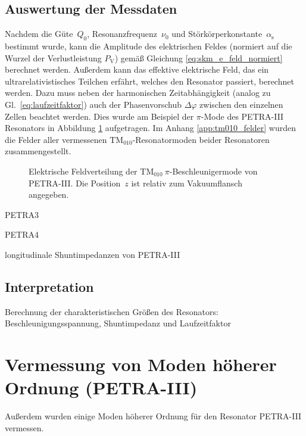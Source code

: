 \subsection{Auswertung der Messdaten}
Nachdem die Güte~$Q_0$, Resonanzfrequenz~$\nu_0$ und Störkörperkonstante~$\alpha_\mathrm{s}$ bestimmt wurde, kann die Amplitude des elektrischen Feldes (normiert auf die Wurzel der Verlustleistung $P_\mathrm{V}$) gemäß Gleichung \eqref{eq:skm_e_feld_normiert} berechnet werden.
Außerdem kann das effektive elektrische Feld, das ein ultrarelativistisches Teilchen erfährt, welches den Resonator passiert, berechnet werden.
Dazu muss neben der harmonischen Zeitabhängigkeit (analog zu Gl.\ \eqref{eq:laufzeitfaktor}) auch der Phasenvorschub $\Delta \varphi$ zwischen den einzelnen Zellen beachtet werden.
Dies wurde am Beispiel der $\pi$-Mode des PETRA-III Resonators in Abbildung \ref{fig:bsp_feld_tm010pi_petra3} aufgetragen.
Im Anhang \ref{app:tm010_felder} wurden die Felder aller vermessenen $\mathrm{TM}_{010}$-Resonatormoden beider Resonatoren zusammengestellt.  
\begin{figure}[h]
	\centering
	
	\caption[Elektrische Feldverteilung der $\mathrm{TM}_{010}~\pi$-Beschleunigermode von PETRA-III]{Elektrische Feldverteilung der $\mathrm{TM}_{010}~\pi$-Beschleunigermode von PETRA-III. Die Position~$z$ ist relativ zum Vakuumflansch angegeben.}
	\label{fig:bsp_feld_tm010pi_petra3}
\end{figure}

\begin{table}
	\begin{subtable}{1\textwidth}
		\centering
		
		\caption{PETRA3}
	\end{subtable}
	\begin{subtable}{1\textwidth}
		\centering
		
		\caption{PETRA4}
	\end{subtable}
	\caption{longitudinale Shuntimpedanzen von PETRA-III }
\end{table}



\subsection{Interpretation}
Berechnung der charakteristischen Größen des Resonators: Beschleunigungsspannung, Shuntimpedanz und Laufzeitfaktor



\section{Vermessung von Moden höherer Ordnung (PETRA-III)}
\label{sec:hom_messung}
Außerdem wurden einige Moden höherer Ordnung für den Resonator PETRA-III vermessen.



